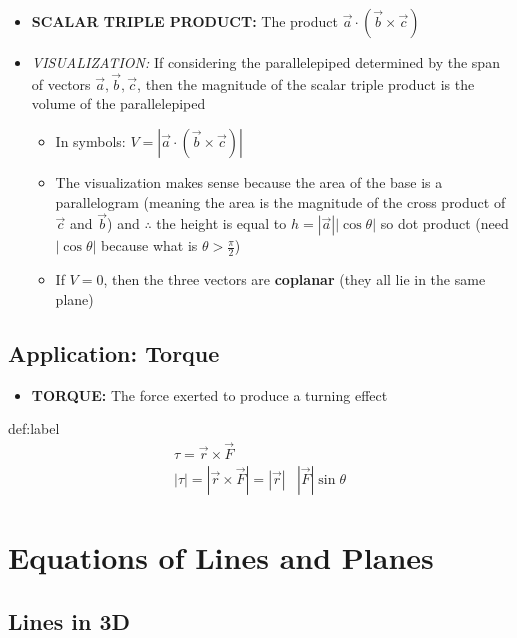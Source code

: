\documentclass{package/notes}
\begin{document}
\begin{itemize}
	\item \textbf{SCALAR TRIPLE PRODUCT:} The product $\vec a \cdot (\vec b \times \vec c)$ 
	\item \textit{VISUALIZATION:} If considering the parallelepiped determined by the span of vectors $\vec a, \vec b, \vec c$, then the magnitude of the scalar triple product is the volume of the parallelepiped
	\begin{itemize}
		\item In symbols: $V = |\vec a \cdot (\vec b \times \vec c)|$
		\item The visualization makes sense because the area of the base is a parallelogram (meaning the area is the magnitude of the cross product of $\vec c$ and $\vec b$) and $\therefore$ the height is equal to $h = |\vec a| |\cos \theta|$ so dot product (need $|\cos\theta|$ because what is $\theta>\frac{\pi}{2}$)
		\item If $ V = 0$, then the three vectors are \textbf{coplanar} (they all lie in the same plane)
	\end{itemize}
\end{itemize}

\subsection{Application: Torque}

\begin{itemize}
	\item \textbf{TORQUE:} The force exerted to produce a turning effect
\end{itemize}

\begin{definition}[Torque]{def:label}
	$$
	\begin{aligned}
		\tau = \vec r \times \vec F&\\
		|\tau| = |\vec r \times \vec F| = |\vec r|&|\vec F|\sin\theta
	\end{aligned}
	$$
\end{definition}


\section{Equations of Lines and Planes}

\subsection{Lines in 3D}
\end{document}
